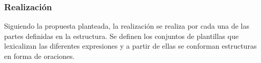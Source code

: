 \subsubsection{Realización}

%
%

    Siguiendo la propuesta planteada, la realización se realiza por cada una de las partes definidas en la estructura. Se definen los conjuntos de 
plantillas que lexicalizan las diferentes expresiones y a partir de ellas se conforman estructuras en forma de oraciones.
\\

